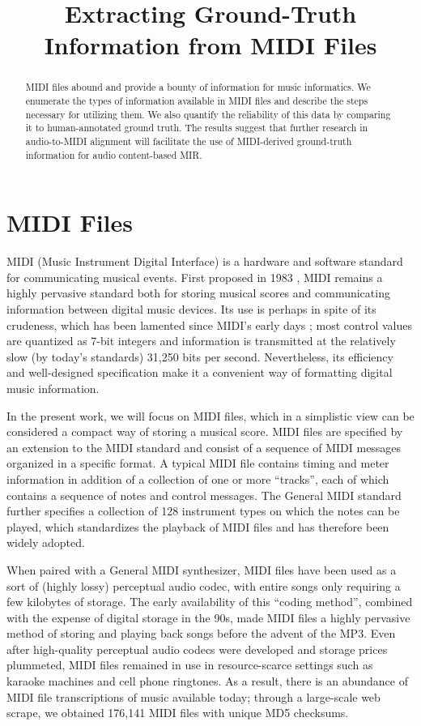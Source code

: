\documentclass{article}
\title{Extracting Ground-Truth Information from MIDI Files}
\begin{document}
\maketitle

\begin{abstract}
MIDI files abound and provide a bounty of information for music informatics.
We enumerate the types of information available in MIDI files and describe the steps necessary for utilizing them.
We also quantify the reliability of this data by comparing it to human-annotated ground truth.
The results suggest that further research in audio-to-MIDI alignment will facilitate the use of MIDI-derived ground-truth information for audio content-based MIR.
\end{abstract}

\section{MIDI Files}\label{sec:introduction}

MIDI (Music Instrument Digital Interface) is a hardware and software standard for communicating musical events.
First proposed in 1983 \cite{international1983midi}, MIDI remains a highly pervasive standard both for storing musical scores and communicating information between digital music devices.
Its use is perhaps in spite of its crudeness, which has been lamented since MIDI's early days \cite{moore1988dysfunctions}; most control values are quantized as 7-bit integers and information is transmitted at the relatively slow (by today's standards) 31,250 bits per second.
Nevertheless, its efficiency and well-designed specification make it a convenient way of formatting digital music information.

In the present work, we will focus on MIDI files, which in a simplistic view can be considered a compact way of storing a musical score.
MIDI files are specified by an extension to the MIDI standard \cite{international1988standard} and consist of a sequence of MIDI messages organized in a specific format.
A typical MIDI file contains timing and meter information in addition of a collection of one or more ``tracks'', each of which contains a sequence of notes and control messages.
The General MIDI standard further specifies a collection of 128 instrument types on which the notes can be played, which standardizes the playback of MIDI files and has therefore been widely adopted.

When paired with a General MIDI synthesizer, MIDI files have been used as a sort of (highly lossy) perceptual audio codec, with entire songs only requiring a few kilobytes of storage.
The early availability of this ``coding method'', combined with the expense of digital storage in the 90s, made MIDI files a highly pervasive method of storing and playing back songs before the advent of the MP3.
Even after high-quality perceptual audio codecs were developed and storage prices plummeted, MIDI files remained in use in resource-scarce settings such as karaoke machines and cell phone ringtones.
As a result, there is an abundance of MIDI file transcriptions of music available today; through a large-scale web scrape, we obtained 176,141 MIDI files with unique MD5 checksums.
\end{document}
